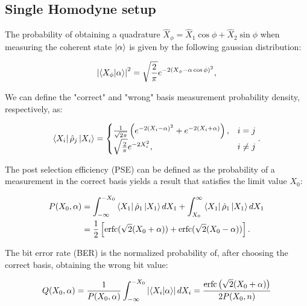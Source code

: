 \documentclass[a4paper]{article}
\begin{document}
\subsection{Single Homodyne setup}

The probability of obtaining a quadrature $\hat{X}_\phi=\hat{X}_1\cos\phi+\hat{X}_2\sin\phi$ when measuring the coherent state $\ket{\alpha}$ is given by the following gaussian distribution:

\begin{equation}
\left|\braket{X_\phi|\alpha}\right|^2=\sqrt{\frac{2}{\pi}}e^{-2(X_\phi-\alpha\cos\phi)^2},
\end{equation}

We can define the "correct" and "wrong" basis measurement probability density, respectively, as:

\begin{equation}\label{eq:probdensity}
\bra{X_i}\hat{\rho}_j\ket{X_i}=
\begin{cases}
\frac{1}{\sqrt{2\pi}}\left(e^{-2(X_i-\alpha)^2}+e^{-2(X_i+\alpha)}\right), & i=j\\
\sqrt{\frac{2}{\pi}}e^{-2X_i^2}, &i\neq j
\end{cases}.
\end{equation} 

The post selection efficiency (PSE) can be defined as the probability of a measurement in the correct basis yields a result that satisfies the limit value $X_0$:

\begin{equation}\label{eq:postselecteff}
\begin{aligned}
P(X_0,\alpha)&=\int^{-X_0}_{-\infty}\bra{X_1}\hat{\rho}_1\ket{X_1}dX_1+\int^{\infty}_{X_0}\bra{X_1}\hat{\rho}_1\ket{X_1}dX_1\\
&=\frac{1}{2}\left[\text{erfc}(\sqrt{2}(X_0+\alpha))+\text{erfc}(\sqrt{2}(X_0-\alpha))\right].
\end{aligned}
\end{equation}

The bit error rate (BER) is the normalized probability of, after choosing the correct basis, obtaining the wrong bit value:

\begin{equation}\label{eq:biterrorratio}
Q(X_0,\alpha)=\frac{1}{P(X_0,\alpha)}\int_{-\infty}^{-X_0}\left|\braket{X_i|\alpha}\right|dX_i=\frac{\text{erfc}\left(\sqrt{2}(X_0+\alpha)\right)}{2P(X_0,n)}
\end{equation}
\end{document}
